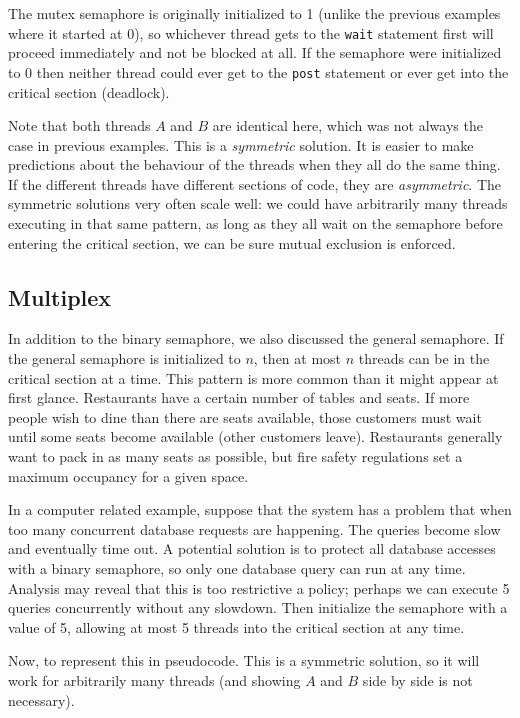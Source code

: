 \documentclass[a4paper]{report}
\begin{document}
The mutex semaphore is originally initialized to 1 (unlike the previous examples where it started at 0), so whichever thread gets to the \texttt{wait} statement first will proceed immediately and not be blocked at all. If the semaphore were initialized to 0 then neither thread could ever get to the \texttt{post} statement or ever get into the critical section (deadlock).

Note that both threads $A$ and $B$ are identical here, which was not always the case in previous examples. This is a \textit{symmetric} solution. It is easier to make predictions about the behaviour of the threads when they all do the same thing. If the different threads have different sections of code, they are \textit{asymmetric}. The symmetric solutions very often scale well: we could have arbitrarily many threads executing in that same pattern, as long as they all wait on the semaphore before entering the critical section, we can be sure mutual exclusion is enforced.

\subsection*{Multiplex}
In addition to the binary semaphore, we also discussed the general semaphore. If the general semaphore is initialized to $n$, then at most $n$ threads can be in the critical section at a time. This pattern is more common than it might appear at first glance. Restaurants have a certain number of tables and seats. If more people wish to dine than there are seats available, those customers must wait until some seats become available (other customers leave). Restaurants generally want to pack in as many seats as possible, but fire safety regulations set a maximum occupancy for a given space.

In a computer related example, suppose that the system has a problem that when too many concurrent database requests are happening. The queries become slow and eventually time out. A potential solution is to protect all database accesses with a binary semaphore, so only one database query can run at any time. Analysis may reveal that this is too restrictive a policy; perhaps we can execute 5 queries concurrently without any slowdown. Then initialize the semaphore with a value of 5, allowing at most 5 threads into the critical section at any time.

Now, to represent this in pseudocode. This is a symmetric solution, so it will work for arbitrarily many threads (and showing $A$ and $B$ side by side is not necessary).
\end{document}

